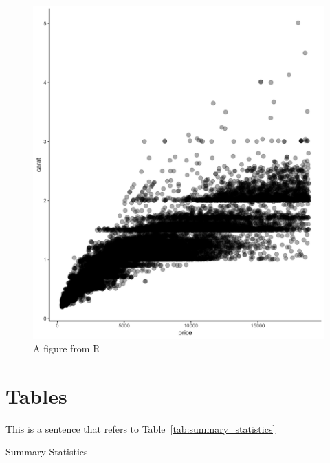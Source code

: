\documentclass[12pt]{article}%
\begin{document}
\begin{figure}[h]
	\caption[R-figure]{A figure from R}
	  \centering
	  \includegraphics[width=\linewidth]{../output/r_figure.png}

	\label{fig:r_figure}
\end{figure}


 \FloatBarrier
\section{Tables}

\FloatBarrier

This is a sentence that refers to Table~\ref{tab:summary_statistics}
\newpage
	\begin{table}[h!]\centering
			\begin{adjustbox}{width=.8\textwidth}
			\centering
			  \begin{threeparttable}
			    \caption{Summary Statistics}
			    \label{tab:summary_statistics}
			  \end{threeparttable}
			 \end{adjustbox}
		\end{table}
\end{document}
